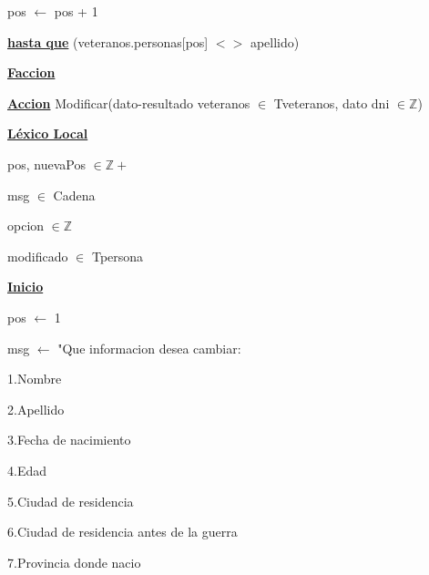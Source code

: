 \documentclass{article}
\begin{document}
                \hspace{16mm}pos $\leftarrow$ pos + 1

            \hspace{12mm}\underline{\textbf{hasta que}} (veteranos.personas[pos] $<>$ apellido)

    \hspace{4mm}\underline{\textbf{Faccion}}

    \vspace{4mm}

    \hspace{4mm}\underline{\textbf{Accion}} Modificar(dato-resultado veteranos $\in$ Tveteranos, dato dni $\in \mathbb{Z}$)

        \hspace{8mm}\underline{\textbf{Léxico Local}}

            \hspace{12mm}pos, nuevaPos $\in \mathbb{Z}+$

            \hspace{12mm}msg $\in$ Cadena

            \hspace{12mm}opcion $\in \mathbb{Z}$

            \hspace{12mm}modificado $\in$ Tpersona

        \hspace{8mm}\underline{\textbf{Inicio}}

            \hspace{12mm}pos $\leftarrow$ 1

            \hspace{12mm}msg $\leftarrow$ "Que informacion desea cambiar: 

                \hspace{25mm}1.Nombre

                \hspace{25mm}2.Apellido

                \hspace{25mm}3.Fecha de nacimiento

                \hspace{25mm}4.Edad

                \hspace{25mm}5.Ciudad de residencia
                
                \hspace{25mm}6.Ciudad de residencia antes de la guerra

                \hspace{25mm}7.Provincia donde nacio
\end{document}
